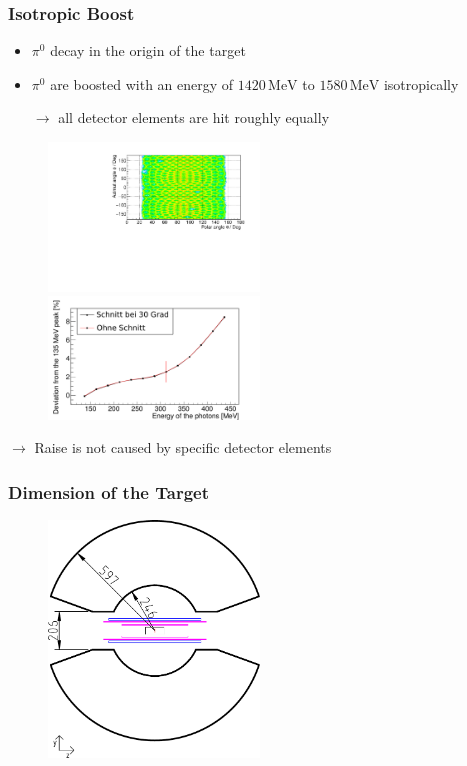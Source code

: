 \documentclass[slidestop,compress,mathserif]{beamer}
\begin{document}
\begin{frame}
	\frametitle{Isotropic Boost}
	\begin{itemize}
		\item $\pi^0$ decay in the origin of the target
		\item $\pi^0$ are boosted with an energy of $ 1420\, \text{MeV}$ to $1580\, \text{MeV}$ isotropically
		
		$\rightarrow$ all detector elements are hit roughly equally 
	\end{itemize}
	
	\begin{figure}
		\includegraphics[width=0.50\textwidth]{Pictures/20171204DistributionPhotonUrsprungIsotrop}
		\includegraphics[width=0.50\textwidth]{Pictures/20172804IsotropUrpsprungDeviation}
	
	\end{figure}
$\rightarrow$ Raise is not caused by specific detector elements
\end{frame}

\begin{frame}
	\frametitle{Dimension of the Target}
	\begin{figure}

		
	\includegraphics[width=0.5\textwidth]{Pictures/cbtaps_side_simple.pdf}
	\end{figure}
	
	
\end{frame}
\end{document}
